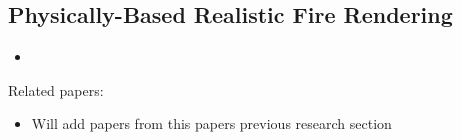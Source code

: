 \documentclass{scrartcl}
\begin{document}
\subsection{Physically-Based Realistic Fire Rendering \cite{Pegoraro}}
\begin{itemize}
	\item 
\end{itemize}
Related papers: \begin{itemize}
	\item Will add papers from this papers previous research section
\end{itemize}

	


	
\end{document}
